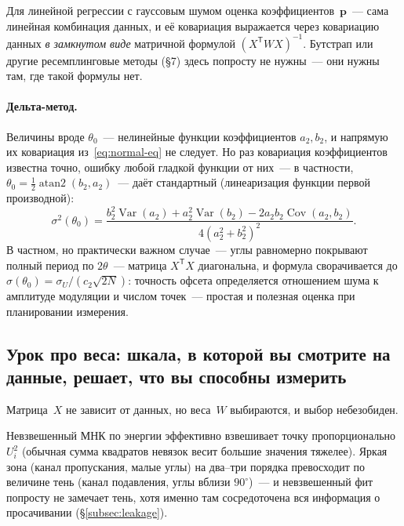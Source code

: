 \begin{intuition}
Для линейной регрессии с гауссовым шумом оценка коэффициентов~$\mathbf{p}$~--- сама линейная
комбинация данных, и её ковариация выражается через ковариацию данных \emph{в замкнутом виде}
матричной формулой $(X^{\mathsf T}WX)^{-1}$. Бутстрап или другие ресемплинговые методы (§7) здесь
попросту не нужны~--- они нужны там, где такой формулы нет.
\end{intuition}

\paragraph{Дельта-метод.} Величины вроде $\theta_0$~--- нелинейные функции коэффициентов
$a_2,b_2$, и напрямую их ковариация из~\eqref{eq:normal-eq} не следует. Но раз ковариация
коэффициентов известна точно, ошибку любой гладкой функции от них~--- в частности,
$\theta_0=\tfrac12\operatorname{atan2}(b_2,a_2)$~--- даёт стандартный 
(линеаризация функции первой производной):
\[
  \sigma^2(\theta_0)=\frac{b_2^2\operatorname{Var}(a_2)+a_2^2\operatorname{Var}(b_2)
  -2a_2b_2\operatorname{Cov}(a_2,b_2)}{4(a_2^2+b_2^2)^2} .
\]
В частном, но практически важном случае~--- углы равномерно покрывают полный период по
$2\theta$~--- матрица $X^{\mathsf T}X$ диагональна, и формула сворачивается до
$\sigma(\theta_0)=\sigma_U/(c_2\sqrt{2N})$: точность офсета определяется отношением шума к
амплитуде модуляции и числом точек~--- простая и полезная оценка при планировании измерения.

\subsection{Урок про веса: шкала, в которой вы смотрите на данные, решает, что вы способны измерить}
\label{subsec:weights}

Матрица~$X$ не зависит от данных, но веса~$W$ выбираются, и выбор небезобиден.

\begin{warning}
Невзвешенный МНК по энергии эффективно взвешивает точку пропорционально~$U_i^2$ (обычная сумма
квадратов невязок весит большие значения тяжелее). Яркая зона (канал пропускания, малые углы)
на два--три порядка превосходит по величине тень (канал подавления, углы вблизи $90^\circ$)~---
и невзвешенный фит попросту не замечает тень, хотя именно там сосредоточена вся информация о
просачивании (§\ref{subsec:leakage}).
\end{warning}

